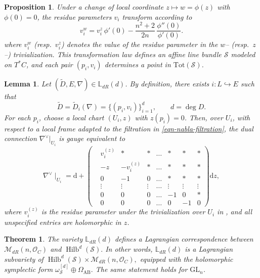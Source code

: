 \documentclass[10pt,a4paper]{amsart}
\newtheorem{proposition}{Proposition}
\newtheorem{lemma}{Lemma}
\newtheorem{theorem}{Theorem}
\begin{document}
\begin{proposition}\label{p: def twist cotanbun}
Under a change of local coordinate \(z \mapsto w = \phi(z)\) with \(\phi(0)=0\), 
the residue parameters \(v_i\) transform according to
\begin{equation}\label{e:transition for affine bundle}
   v_i^{w}
=
v_i^{z}\,\phi'(0)
-
\frac{n^2+2}{2n}\,
\frac{\phi''(0)}{\phi'(0)} .
\end{equation}
where \(v_i^{w}\) (resp.\ \(v_i^{z}\)) denotes the value of the residue parameter 
in the \(w\)– (resp.\ \(z\)–) trivialization.  
This transformation law defines an affine line bundle \(\mathcal{S}\) modeled on \(T^*C\), 
and each pair \((p_i, v_i)\) determines a point in \(\mathrm{Tot}(\mathcal{S})\).
\end{proposition}

\begin{lemma}\label{l: standard form near div dr}
Let $(\widetilde D,E,\nabla)\in\mathbb{L}_{dR}(d)$. By definition, there exists 
$i: L \hookrightarrow E$ such that 
\[
\widetilde D=\widetilde{D}_i(\nabla)=\{(p_i,v_i)\}_{i=1}^d,
\qquad d=\deg D.
\]
For each $p_i$, choose a local chart $(U_i,z)$ with $z(p_i)=0$.
Then, over $U_i$, with respect to a local frame adapted to the filtration in \eqref{eqn-nabla-filtration}, the dual connection $\nabla^{\vee}|_{U_i}$ is gauge equivalent to
\begin{equation}\label{e: gauge form for nabla Ui}
    \nabla^{\vee} \mid_{U_i} = \mathrm{d} +
    \begin{pmatrix}
        &v^{(z)}_i  &\ast &\ast &\dots &\ast &\ast &\ast  \\
        &-z &-v^{(z)}_i &\ast &\dots &\ast &\ast &\ast \\
        &0 &-1  &0 &\dots &\ast &\ast &\ast \\
        &\vdots &\vdots &\vdots &\dots &\vdots  &\vdots &\vdots \\
        &0  &0 &0 &\dots &-1 &0 &\ast \\
        &0  &0 &0 &\dots &0 &-1 & 0 
    \end{pmatrix} \mathrm{d}z,
\end{equation}
where $v^{(z)}_i$ is the residue parameter under the trivialization over $U_i$ in , and all unspecified entries are holomorphic in $z$.
\end{lemma}

\begin{theorem}\label{thm: Lag corres dR; SLn}
The variety $\mathbb{L}_{dR}(d)$ defines a \emph{Lagrangian correspondence} between
\(
\mathcal{M}_{dR}(n, \mathcal{O}_C)
\)
and
\(
\operatorname{Hilb}^d(\mathcal{S}).
\)
In other words, $\mathbb{L}_{dR}(d)$ is a Lagrangian subvariety of
\(
\operatorname{Hilb}^d(\mathcal{S})\times \mathcal{M}_{dR}(n, \mathcal{O}_C),
\)
equipped with the holomorphic symplectic form
\(
\omega_{\mathcal{S}}^{[d]}\oplus \Omega_{\mathrm{AB}}.
\)
The same statement holds for $\mathrm{GL}_n$.
\end{theorem}
\end{document}
